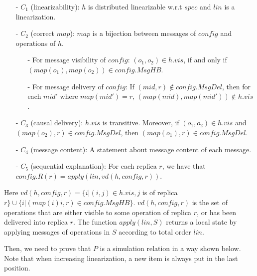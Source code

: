 \begin{itemize}
\setlength{\itemsep}{0.5pt}
\item[-] $C_1$ (linearizability): $h$ is distributed linearizable w.r.t $\mathit{spec}$ and $\mathit{lin}$ is a linearization.

\item[-] $C_2$ (correct $\mathit{map}$): $\mathit{map}$ is a bijection between messages of $\mathit{config}$ and operations of $h$.

    \begin{itemize}
    \setlength{\itemsep}{0.5pt}
    \item[-] For message visibility of $\mathit{config}$: $(o_1,o_2) \in h.\mathit{vis}$, if and only if $(\mathit{map}(o_1),\mathit{map}(o_2)) \in \mathit{config}.\mathit{MsgHB}$.

    \item[-] For message delivery of $\mathit{config}$: If $(\mathit{mid},r) \notin \mathit{config}.\mathit{MsgDel}$, then for each $\mathit{mid}'$ where $\mathit{map}(\mathit{mid}') = r$, $(\mathit{map}(\mathit{mid}),\mathit{map}(\mathit{mid}')) \notin h.\mathit{vis}$.
    \end{itemize}

\item[-] $C_3$ (causal delivery): $h.\mathit{vis}$ is transitive. Moreover, if $(o_1,o_2) \in h.\mathit{vis}$ and $(\mathit{map}(o_2),r) \in \mathit{config}.\mathit{MsgDel}$, then $(\mathit{map}(o_1),r) \in \mathit{config}.\mathit{MsgDel}$.
    
\item[-] $C_4$ (message content): A statement about message content of each message.   

\item[-] $C_5$ (sequential explanation): For each replica $r$, we have that $\mathit{config}.R(r) = \mathit{apply}(\mathit{lin},\mathit{vd}(h,\mathit{config},r))$. 
\end{itemize} 

Here $\mathit{vd}(h,\mathit{config},r) = \{ i \vert (i,j) \in h.\mathit{vis}, j$ is of replica $r \} \cup \{ i \vert (\mathit{map}(i)i,r) \in \mathit{config}.\mathit{MsgHB} \}$. $\mathit{vd}(h,\mathit{config},r)$ is the set of operations that are either visible to some operation of replica $r$, or has been delivered into replica $r$. The function $\mathit{apply}(\mathit{lin},S)$ returns a local state by applying messages of operations in $S$ according to total order $\mathit{lin}$. 


Then, we need to prove that $P$ is a simulation relation in a way shown below. Note that when increasing linearization, a new item is always put in the last position. 

